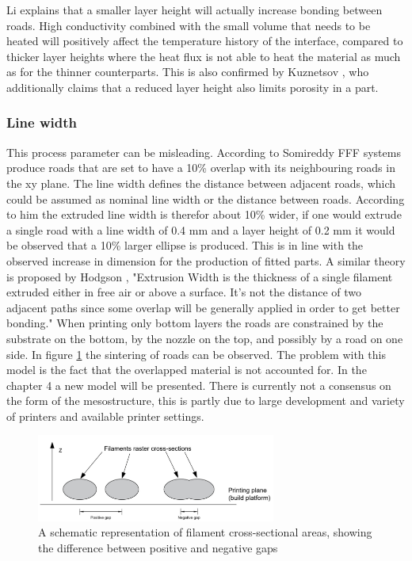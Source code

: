 Li \cite{Li2017TheProperties} explains that a smaller layer height will actually increase bonding between roads. High conductivity combined with the small volume that needs to be heated will positively affect the temperature history of the interface, compared to thicker layer heights where the heat flux is not able to heat the material as much as for the thinner counterparts. This is also confirmed by Kuznetsov \cite{Kuznetsov2018StrengthProcess}, who additionally claims that a reduced layer height also limits porosity in a part.

\subsubsection{Line width}
This process parameter can be misleading. According to Somireddy \cite{Somireddy2017MechanicalMesostructure} FFF systems produce roads that are set to have a 10\% overlap with its neighbouring roads in the xy plane. The line width defines the distance between adjacent roads, which could be assumed as nominal line width or the distance between roads. According to him the extruded line width is therefor about 10\% wider, if one would extrude a single road with a line width of 0.4 mm and a layer height of 0.2 mm it would be observed that a 10\% larger ellipse is produced. 
This is in line with the observed increase in dimension for the production of fitted parts. A similar theory is proposed by Hodgson \cite{GaryHodgsonSlic3rMath}, "Extrusion Width is the thickness of a single filament extruded either in free air or above a surface. It's not the distance of two adjacent paths since some overlap will be generally applied in order to get better bonding."
When printing only bottom layers the roads are constrained by the substrate on the bottom, by the nozzle on the top, and possibly by a road on one side.  In figure \ref{fig:roadconnecting} the sintering of roads can be observed. The problem with this model is the fact that the overlapped material is not accounted for. In the chapter 4 a new model will be presented. There is currently not a consensus on the form of the mesostructure, this is partly due to large development and  variety of printers and available printer settings.

\begin{figure}[H]
    \centering
    \includegraphics[width=0.7\textwidth]{chapter_2/figures/roadconnecting.PNG}
    \caption{A schematic representation of filament cross-sectional areas, showing the difference between positive and negative gaps \cite{Cuan-Urquizo2019CharacterizationApproaches}}
    \label{fig:roadconnecting}
\end{figure}

